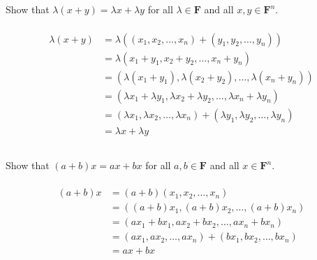 \documentclass[a4paper]{article}
\begin{document}
\subsection{}
Show that $\lambda(x+y)=\lambda x+\lambda y$   for all  $\lambda \in \mathbf{F}$  and all  $x, y \in \mathbf{F}^{n}$.
\paragraph{}
\[
    \begin{aligned}
        \lambda(x+y) & =\lambda((x_1,x_2,\ldots,x_n)+(y_1,y_2,\ldots,y_n))                                        \\
                     & =\lambda(x_1+y_1,x_2+y_2,\ldots,x_n+y_n)                                                   \\
                     & =(\lambda(x_1+y_1),\lambda(x_2+y_2),\ldots,\lambda(x_n+y_n))                               \\
                     & =(\lambda x_1+\lambda y_1,\lambda x_2+\lambda y_2,\ldots,\lambda x_n+\lambda y_n)          \\
                     & =(\lambda x_1,\lambda x_2,\ldots,\lambda x_n)+(\lambda y_1,\lambda y_2,\ldots,\lambda y_n) \\
                     & =\lambda x+\lambda y
    \end{aligned}
\]

\subsection{}
Show that $(a+b) x=a x+b x$ for all $a, b \in \mathbf{F}$ and all $x \in \mathbf{F}^{n}$.
\paragraph{}
\[
    \begin{aligned}
        (a+b) x & =(a+b)(x_1,x_2,\ldots,x_n)                       \\
                & =((a+b)x_1,(a+b)x_2,\ldots,(a+b)x_n)             \\
                & =(ax_1+bx_1,ax_2+bx_2,\ldots,ax_n+bx_n)          \\
                & =(ax_1,ax_2,\ldots,ax_n)+(bx_1,bx_2,\ldots,bx_n) \\
                & =ax+bx
    \end{aligned}
\]

\section{}
\end{document}
